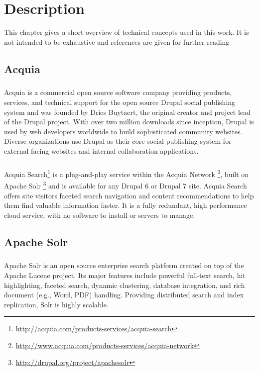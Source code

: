 \chapter{Description}
\label{chap:description}
This chapter gives a short overview of technical concepts used in this work. It is not intended
to be exhaustive and references are given for further reading

\section{Acquia}
\paragraph{} 
Acquia is a commercial open source software company providing products, services, and technical support for the open source Drupal social publishing system and was founded by Dries Buytaert, the original creator and project lead of the Drupal project. With over two million downloads since inception, Drupal is used by web developers worldwide to build sophisticated community websites. Diverse organizations use Drupal as their core social publishing system for external facing websites and internal collaboration applications.

\paragraph{}
Acquia Search\footnote{\url{http://acquia.com/products-services/acquia-search}} is a plug-and-play service within the Acquia Network \footnote{\url{http://www.acquia.com/products-services/acquia-network}}, built on Apache Solr \footnote{\url{http://drupal.org/project/apachesolr}} and is available for any Drupal 6 or Drupal 7 site. Acquia Search offers site visitors faceted search navigation and content recommendations to help them find valuable information faster. It is a fully redundant, high performance cloud service, with no software to install or servers to manage.

\section{Apache Solr}
\paragraph{}
Apache Solr is an open source enterprise search platform created on top of the Apache Lucene project. Its major features include powerful full-text search, hit highlighting, faceted search, dynamic clustering, database integration, and rich document (e.g., Word, PDF) handling. Providing distributed search and index replication, Solr is highly scalable.

